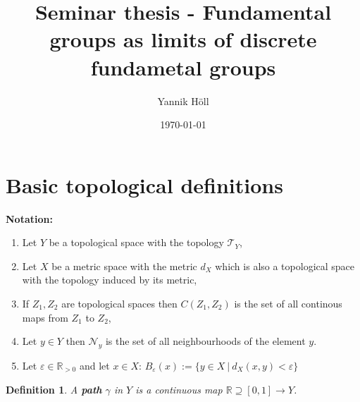 \documentclass{article}
\title{Seminar thesis - Fundamental groups as limits of discrete fundametal groups}
\author{Yannik Höll}
\date{\today}
\newcommand{\R}[0]{\mathbb{R}}
\newcommand{\T}[0]{\mathcal{T}}
\newcommand{\NB}[0]{\mathcal{N}}
\theoremstyle{break}
\theoremstyle{break}
\newtheorem{defin}[thm]{Definition}
\begin{document}
\nocite{*}

\maketitle


\section{Basic topological definitions} \label{section-basic-defs}


\textbf{Notation:}
\begin{enumerate}
  \item Let $Y$ be a topological space with the topology $\T_Y$,
  \item Let $X$ be a metric space with the metric $d_X$ which is also a topological space with the topology induced by its metric,
  \item If $Z_1, Z_2$ are topological spaces then $C(Z_1, Z_2)$ is the set of all continous maps from $Z_1$ to $Z_2$,
  \item Let $y \in Y$ then $\NB_y$ is the set of all neighbourhoods of the element $y$.
  \item Let $\varepsilon \in \R_{>0}$ and let $x \in X$: $B_{\varepsilon}(x) := \{ y\in X \: | \: d_X(x, y) < \varepsilon\}$
\end{enumerate}

\begin{defin}
  A \textbf{path} $\gamma$ in $Y$ is a continuous map $\R \supseteq [0,1] \to Y$.
\end{defin}
\end{document}

